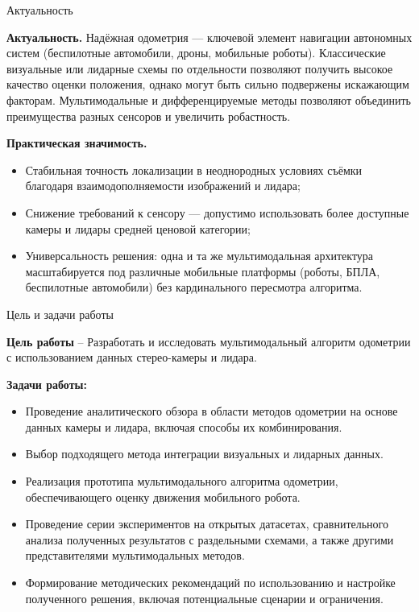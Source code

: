 \documentclass{beamer} %
\begin{document}
\begin{frame}{Актуальность}
  \footnotesize{

  \textbf{Актуальность.}  
  Надёжная одометрия — ключевой элемент навигации автономных систем  
  (беспилотные автомобили, дроны, мобильные роботы).  
  Классические визуальные или лидарные схемы по отдельности  
  позволяют получить высокое качество оценки положения, однако могут быть сильно подвержены искажающим факторам. 
  Мультимодальные и дифференцируемые методы позволяют объединить
  преимущества разных сенсоров и увеличить робастность.

  \vspace{0.8cm}

  \textbf{Практическая значимость.}
  \begin{itemize}
      \item Стабильная точность локализации в неоднородных условиях съёмки  
         благодаря взаимодополняемости
        изображений и лидара;
    \item Снижение требований к сенсору --- допустимо
          использовать более доступные камеры и лидары средней ценовой категории;
    \item Универсальность решения: одна и та же мультимодальная
          архитектура масштабируется под различные мобильные платформы  
          (роботы, БПЛА, беспилотные автомобили) без кардинального пересмотра
          алгоритма.
  \end{itemize}
  }
\end{frame}




\begin{frame}{Цель и задачи работы}
  \footnotesize{

  \textbf{Цель работы} -- Разработать и исследовать мультимодальный алгоритм одометрии с использованием
  данных стерео-камеры и лидара.

  \vspace{0.6cm}

  \textbf{Задачи работы:}
  \begin{itemize}
      \item Проведение аналитического обзора в области методов одометрии на основе данных
      камеры и лидара, включая способы их комбинирования.
      \item Выбор подходящего метода интеграции визуальных и лидарных данных.
      \item Реализация прототипа мультимодального алгоритма одометрии, обеспечивающего
      оценку движения мобильного робота.
      \item Проведение серии экспериментов на открытых датасетах, сравнительного анализа
      полученных результатов с раздельными схемами, а также
      другими представителями мультимодальных методов.
      \item Формирование методических рекомендаций по использованию и настройке полученного
      решения, включая потенциальные сценарии и ограничения.
  \end{itemize}
  }
\end{frame}
\end{document}
